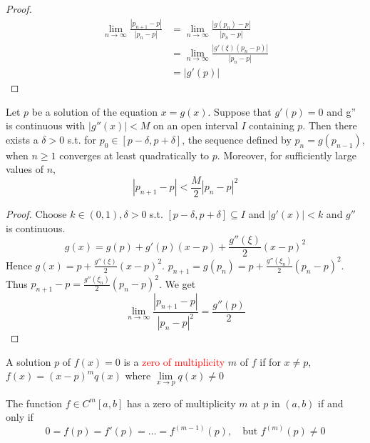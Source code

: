 \documentclass[11pt]{article}
\begin{document}
\begin{proof}
\begin{align*}
\lim\limits_{n\to\infty}\frac{|p_{n+1}-p|}{|p_n-p|}&=
\lim\limits_{n\to\infty}\frac{|g(p_n)-p|}{|p_n-p|}\\
&=\lim\limits_{n\to\infty}\frac{|g'(\xi)(p_n-p)|}{|p_n-p|}\\
&=|g'(p)|
\end{align*}
\end{proof}

\begin{theorem}
Let $p$ be a solution of the equation $x=g(x)$. Suppose that $g'(p)=0$ and
g'' is continuous with $|g''(x)|<M$ on an open interval $I$ containing $p$.
Then there exists a $\delta>0$ s.t. for $p_0\in[p-\delta,p+\delta]$, the
sequence defined by $p_n=g(p_{n-1})$, when $n\ge 1$ converges at least
quadratically to $p$. Moreover, for sufficiently large values of $n$,
\begin{equation*}
|p_{n+1}-p|<\frac{M}{2}|p_n-p|^2
\end{equation*}
\end{theorem}

\begin{proof}
Choose $k\in(0,1),\delta>0$ s.t. $[p-\delta,p+\delta]\subseteq I$ and
$|g'(x)|<k$ and $g''$ is continuous.
\begin{equation*}
g(x)=g(p)+g'(p)(x-p)+\frac{g''(\xi)}{2}(x-p)^2
\end{equation*}
Hence $g(x)=p+\frac{g''(\xi)}{2}(x-p)^2$.
$p_{n+1}=g(p_n)=p+\frac{g''(\xi_n)}{2}(p_n-p)^2$. Thus
$p_{n+1}-p=\frac{g''(\xi_n)}{2}(p_n-p)^2$. We get
\begin{equation*}
\lim\limits_{n\to\infty}\frac{|p_{n+1}-p|}{|p_n-p|^2}=\frac{g''(p)}{2}
\end{equation*}
\end{proof}

\begin{definition}
A solution $p$ of $f(x) = 0$ is a \textcolor{red}{zero of multiplicity} $m$
of $f$ if for $x\neq p$, $f(x)=(x-p)^mq(x)$ where $\lim\limits_{x\to
p}q(x)\neq 0$
\end{definition}

\begin{theorem}
The function $f\in C^m[a,b]$ has a zero of multiplicity $m$ at $p$ in $(a,b)$
if and only if
\begin{equation*}
0=f(p)=f'(p)=\dots=f^{(m-1)}(p),\quad\text{but } f^{(m)}(p)\neq 0
\end{equation*}
\end{theorem}
\end{document}
